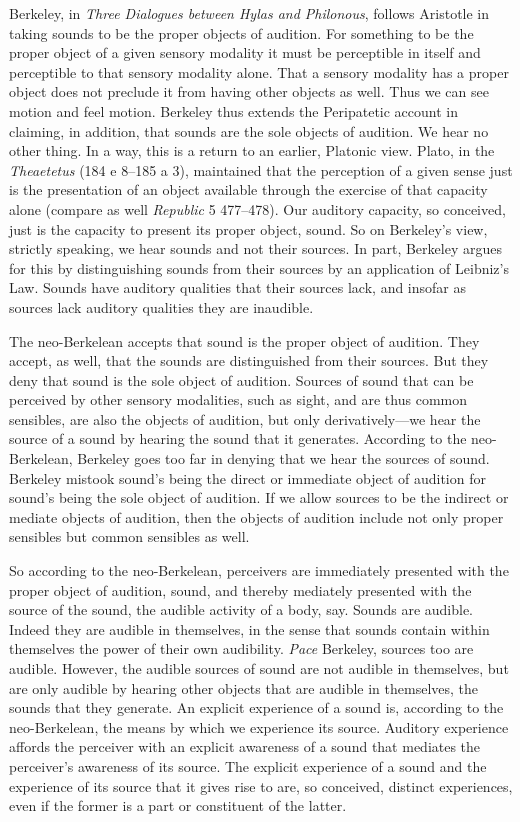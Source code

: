 \nocite{Berkeley:1734fk} Berkeley, in \emph{Three Dialogues between Hylas and Philonous}, follows Aristotle in taking sounds to be the proper objects of audition. For something to be the proper object of a given sensory modality it must be perceptible in itself and perceptible to that sensory modality alone. That a sensory modality has a proper object does not preclude it from having other objects as well. Thus we can see motion and feel motion. Berkeley thus extends the Peripatetic account in claiming, in addition, that sounds are the sole objects of audition. We hear no other thing. In a way, this is a return to an earlier, Platonic view. Plato, in the \emph{Theaetetus} (184 e 8--185 a 3), maintained that the perception of a given sense just is the presentation of an object available through the exercise of that capacity alone (compare as well \emph{Republic} 5 477--478). Our auditory capacity, so conceived, just is the capacity to present its proper object, sound. So on Berkeley's view, strictly speaking, we hear sounds and not their sources. In part, Berkeley argues for this by distinguishing sounds from their sources by an application of Leibniz's Law. Sounds have auditory qualities that their sources lack, and insofar as sources lack auditory qualities they are inaudible. 

The neo-Berkelean accepts that sound is the proper object of audition. They accept, as well, that the sounds are distinguished from their sources. But they deny that sound is the sole object of audition. Sources of sound that can be perceived by other sensory modalities, such as sight, and are thus common sensibles, are also the objects of audition, but only derivatively---we hear the source of a sound by hearing the sound that it generates. According to the neo-Berkelean, Berkeley goes too far in denying that we hear the sources of sound. Berkeley mistook sound's being the direct or immediate object of audition for sound's being the sole object of audition. If we allow sources to be the indirect or mediate objects of audition, then the objects of audition include not only proper sensibles but common sensibles as well.

So according to the neo-Berkelean, perceivers are immediately presented with the proper object of audition, sound, and thereby mediately presented with the source of the sound, the audible activity of a body, say. Sounds are audible. Indeed they are audible in themselves, in the sense that sounds contain within themselves the power of their own audibility. \emph{Pace} Berkeley, sources too are audible. However, the audible sources of sound are not audible in themselves, but are only audible by hearing other objects that are audible in themselves, the sounds that they generate. An explicit experience of a sound is, according to the neo-Berkelean, the means by which we experience its source.  Auditory experience affords the perceiver with an explicit awareness of a sound that mediates the perceiver's awareness of its source. The explicit experience of a sound and the experience of its source that it gives rise to are, so conceived, distinct experiences, even if the former is a part or constituent of the latter.

